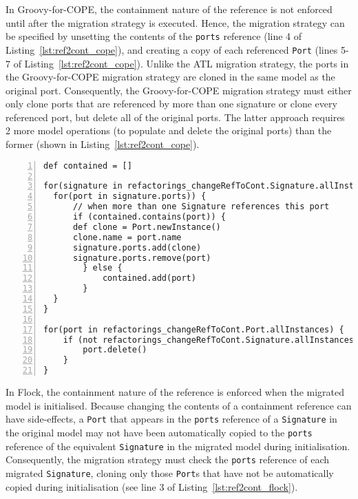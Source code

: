 In Groovy-for-COPE, the containment nature of the reference is not enforced until after the migration strategy is executed. Hence, the migration strategy can be specified by unsetting the contents of the \texttt{ports} reference (line 4 of Listing~\ref{lst:ref2cont_cope}), and creating a copy of each referenced \texttt{Port} (lines 5-7 of Listing~\ref{lst:ref2cont_cope}). Unlike the ATL migration strategy, the ports in the Groovy-for-COPE migration strategy are cloned in the same model as the original port. Consequently, the Groovy-for-COPE migration strategy must either only clone ports that are referenced by more than one signature or clone every referenced port, but delete all of the original ports. The latter approach requires 2 more model operations (to populate and delete the original ports) than the former (shown in Listing~\ref{lst:ref2cont_cope}).

\begin{lstlisting}[basicstyle=\ttfamily\footnotesize, flexiblecolumns=true, numbers=left, nolol=true, caption=Change R to C model migration in COPE, label=lst:ref2cont_cope, language=COPE, tabsize=2]
def contained = []

for(signature in refactorings_changeRefToCont.Signature.allInstances) {
  for(port in signature.ports)) {
	  // when more than one Signature references this port
	  if (contained.contains(port)) {
      def clone = Port.newInstance()
      clone.name = port.name
      signature.ports.add(clone)
      signature.ports.remove(port)
		} else {
			contained.add(port)
		}
  }
}

for(port in refactorings_changeRefToCont.Port.allInstances) {
	if (not refactorings_changeRefToCont.Signature.allInstances.any { it.ports.contains(port) }) {
	  	port.delete()
	}
}
\end{lstlisting}

In Flock, the containment nature of the reference is enforced when the migrated model is initialised. Because changing the contents of a containment reference can have side-effects, a \texttt{Port} that appears in the \texttt{ports} reference of a \texttt{Signature} in the original model may not have been automatically copied to the \texttt{ports} reference of the equivalent \texttt{Signature} in the migrated model during initialisation. Consequently, the migration strategy must check the \texttt{ports} reference of each migrated \texttt{Signature}, cloning only those \texttt{Port}s that have not be automatically copied during initialisation (see line 3 of Listing~\ref{lst:ref2cont_flock}).

